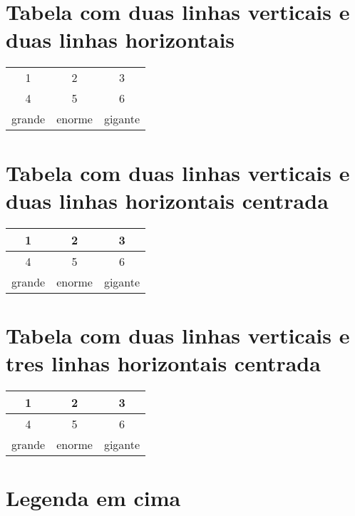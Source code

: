 \documentclass[a4paper, 11pt]{report}
\begin{document}
\section{Tabela com duas linhas verticais e duas linhas horizontais}

\begin{table}[h!]
	\centering
	\begin{tabular}{ | c| c|  c|}
		\hline
		1      & 2        & 3      \\
		4      & 5        & 6      \\
		\hline
		grande & enorme   & gigante \\
	\end{tabular}
\end{table}

\section{Tabela com duas linhas verticais e duas linhas horizontais centrada}

\begin{table}[h!]
	\centering
	\begin{tabular}{ | c | c |  c|}
		\hline
		1      & 2        & 3      \\
		\hline
		4      & 5        & 6      \\
		\hline
		grande & enorme   & gigante \\
	\end{tabular}
\end{table}

\section{Tabela com duas linhas verticais e tres linhas horizontais centrada}

\begin{table}[h!]
	\centering
	\begin{tabular}{ | c | c |  c|}
		\hline
		1      & 2        & 3      \\
		\hline
		4      & 5        & 6      \\
		\hline
		grande & enorme   & gigante \\
		\hline
	\end{tabular}
\end{table}

\section{Legenda em cima}
\end{document}
